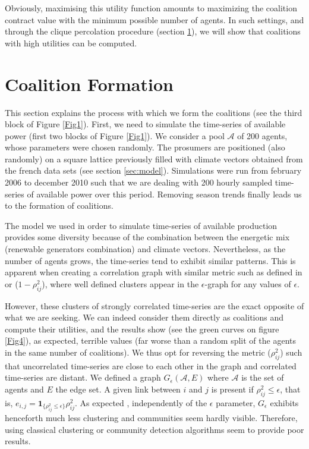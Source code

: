 \documentclass[conference]{IEEEtran}
\begin{document}
Obviously, maximising this utility function amounts to maximizing the coalition contract value with the minimum possible number of agents. In such settings, and through the clique percolation procedure (section \ref{sec:forming}), we will show that coalitions with high utilities can be computed.

%
%

\section{Coalition Formation}
\label{sec:forming}

This section explains the process with which we form the coalitions (see the third block of Figure \ref{Fig1}). First, we need to simulate the time-series of available power (first two blocks of Figure \ref{Fig1}). We consider a pool $ \mathcal{A} $ of 200 agents, whose parameters were chosen randomly. The prosumers are positioned (also randomly) on a square lattice previously filled with climate vectors obtained from the french data sets (see section \ref{sec:model}). Simulations were run from february 2006 to december 2010 such that we are dealing with 200 hourly sampled time-series of available power over this period. Removing season trends finally leads us to the formation of coalitions. 

The model we used in order to simulate time-series of available production provides some diversity because of the combination between the energetic mix (renewable generators combination) and climate vectors. Nevertheless, as the number of agents grows, the time-series tend to exhibit similar patterns. This is apparent when creating a correlation graph with similar metric such as defined in \cite{Garas2008} or \cite{Onnela2004} ($ 1 - \rho_{ij}^{2} $), where well defined clusters appear in the $ \epsilon $-graph for any values of $ \epsilon $. 

However, these clusters of strongly correlated time-series are the exact opposite of what we are seeking. We can indeed consider them directly as coalitions and compute their utilities, and the results show (see the green curves on figure \ref{Fig4}), as expected, terrible values (far worse than a random split of the agents in the same number of coalitions). We thus opt for reversing the metric ($ \rho_{ij}^{2} $) such that uncorrelated time-series are close to each other in the graph and correlated time-series are distant. We defined a graph $G_\epsilon(\mathcal{A},E)$ where $\mathcal{A}$ is the set of agents and $ E $ the edge set. A given link between $ i $ and $ j $ is present if $ \rho_{ij}^{2} \leq \epsilon $, that is, $ e_{i,j} = \mathbf{1}_{\{\rho_{ij}^{2} \leq \epsilon \}}\rho_{ij}^{2} $. As expected \cite{Onnela2004}, independently of the $ \epsilon $ parameter, $ G_{\epsilon } $ exhibits henceforth much less clustering and communities seem hardly visible. Therefore, using classical clustering or community detection algorithms seem to provide poor results. 
\end{document}
